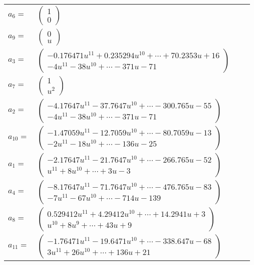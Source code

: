 \documentclass[1p]{elsarticle_modified}
\theoremstyle{definition}
\begin{document}
\begin{tabular}{m{7pt} m{180pt} m{7pt} m{180pt} }
\flushright $a_{6}=$&$\begin{pmatrix}1\\0\end{pmatrix}$ \\
\flushright $a_{9}=$&$\begin{pmatrix}0\\u\end{pmatrix}$ \\
\flushright $a_{3}=$&$\begin{pmatrix}-0.176471 u^{11}+0.235294 u^{10}+\cdots+70.2353 u+16\\-4 u^{11}-38 u^{10}+\cdots-371 u-71\end{pmatrix}$ \\
\flushright $a_{7}=$&$\begin{pmatrix}1\\u^2\end{pmatrix}$ \\
\flushright $a_{2}=$&$\begin{pmatrix}-4.17647 u^{11}-37.7647 u^{10}+\cdots-300.765 u-55\\-4 u^{11}-38 u^{10}+\cdots-371 u-71\end{pmatrix}$ \\
\flushright $a_{10}=$&$\begin{pmatrix}-1.47059 u^{11}-12.7059 u^{10}+\cdots-80.7059 u-13\\-2 u^{11}-18 u^{10}+\cdots-136 u-25\end{pmatrix}$ \\
\flushright $a_{1}=$&$\begin{pmatrix}-2.17647 u^{11}-21.7647 u^{10}+\cdots-266.765 u-52\\u^{11}+8 u^{10}+\cdots+3 u-3\end{pmatrix}$ \\
\flushright $a_{4}=$&$\begin{pmatrix}-8.17647 u^{11}-71.7647 u^{10}+\cdots-476.765 u-83\\-7 u^{11}-67 u^{10}+\cdots-714 u-139\end{pmatrix}$ \\
\flushright $a_{8}=$&$\begin{pmatrix}0.529412 u^{11}+4.29412 u^{10}+\cdots+14.2941 u+3\\u^{10}+8 u^9+\cdots+43 u+9\end{pmatrix}$ \\
\flushright $a_{11}=$&$\begin{pmatrix}-1.76471 u^{11}-19.6471 u^{10}+\cdots-338.647 u-68\\3 u^{11}+26 u^{10}+\cdots+136 u+21\end{pmatrix}$ \\

\end{tabular}
\end{document}
